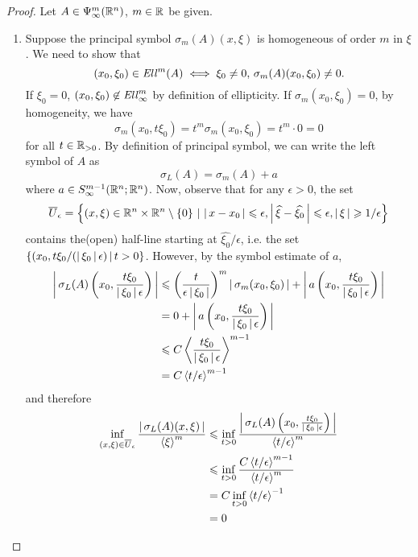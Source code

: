 \documentclass{article}
\begin{document}
\begin{proof}
    Let $A \in \Psi^m_\infty(\R^n)$, $m \in \R$ be given. 
    \begin{enumerate}
        \item Suppose the principal symbol $\sigma_m(A)(x, \xi)$ is homogeneous of order $m$ in $\xi$. We need to show that 
        \[
        (x_0, \xi_0) \in \Ell^m(A) \iff \xi_0 \neq 0, \, \sigma_m(A)(x_0, \xi_0) \neq 0. 
        \]
        If $\xi_0 = 0$, $(x_0, \xi_0) \not \in \Ell^m_\infty$ by definition of ellipticity. If $\sigma_m(x_0, \xi_0) = 0$, by homogeneity, we have 
        \[
        \sigma_m(x_0, t \xi_0) = t^m \sigma_m(x_0, \xi_0) = t^m \cdot 0 = 0
        \]
        for all $t \in \R_{> 0}$. By definition of principal symbol, we can write the left symbol of $A$ as 
        \[
        \sigma_L(A) = \sigma_m(A) + a
        \]
        where $a \in S^{m -1}_\infty(\R^n; \R^n)$. Now, observe that for any $\epsilon > 0$, the set 
         \[
        \overline{U}_\epsilon = \set{(x, \xi) \in \R^n \times \R^n \setminus \set{0} \wh \abs{x - x_0} \leq \epsilon, \abs{\widehat{\xi} - \widehat{\xi_0}} \leq \epsilon, \abs{\xi} \geq 1/\epsilon}
        \]
        contains the(open) half-line starting at $\widehat{\xi_0} / \epsilon$, i.e. the set $\set{(x_0, t \xi_0/(\abs{\xi_0}\epsilon)\wh t > 0}$. However, by the symbol estimate of $a$, 
        \begin{align*}
        \abs{\sigma_L(A)\brac{x_0, \frac{t \xi_0}{\abs{\xi_0} \epsilon}}}
        & \leq \brac{\frac{t}{\epsilon \abs{\xi_0}}}^m \abs{\sigma_m(x_0, \xi_0)} + \abs{a\brac{x_0, \frac{t \xi_0}{\abs{\xi_0} \epsilon}}} \\
        & = 0 + \abs{a\brac{x_0, \frac{t \xi_0}{\abs{\xi_0} \epsilon}}} \\
        & \leq C \sym[\frac{t \xi_0}{\abs{\xi_0} \epsilon}]^{m - 1} \\
        & = C\sym[t/\epsilon]^{m - 1}
        \end{align*}
        and therefore 
        \begin{align*}
        \inf_{(x, \xi) \in \overline{U}_\epsilon} \frac{\abs{\sigma_L(A)(x, \xi)}}{\sym[\xi]^m} 
        & \leq \inf_{t > 0}  \frac{\abs{\sigma_L(A)\brac{x_0, \frac{t \xi_0}{\abs{\xi_0} \epsilon}}} }{\sym[t /\epsilon]^m} \\
        & \leq \inf_{t > 0}  \frac{C\sym[t/ \epsilon]^{m - 1} }{\sym[t /\epsilon]^m} \\
        & = C\inf_{t > 0} \sym[t/\epsilon]^{-1}\\
        & = 0

\end{align*}
\end{enumerate}
\end{proof}
\end{document}
